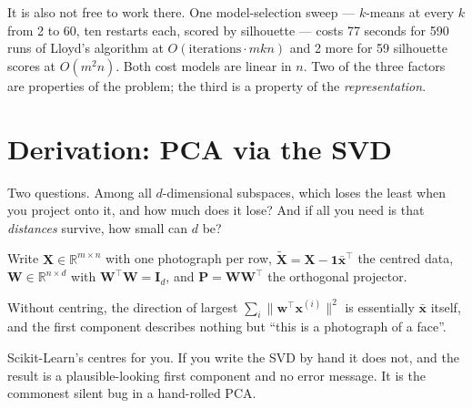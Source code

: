 \documentclass[11pt,a4paper]{article}
\begin{document}
It is also not free to work there. One model-selection sweep --- $k$-means at
every $k$ from 2 to 60, ten restarts each, scored by silhouette --- costs 77
seconds for 590 runs of Lloyd's algorithm at $O(\text{iterations}\cdot mkn)$
and 2 more for 59 silhouette scores at $O(m^2 n)$. Both cost models are linear
in $n$. Two of the three factors are properties of the problem; the third is a
property of the \emph{representation}.

\section{Derivation: PCA via the SVD}

Two questions. Among all $d$-dimensional subspaces, which loses the least when
you project onto it, and how much does it lose? And if all you need is that
\emph{distances} survive, how small can $d$ be?

Write $\mathbf{X} \in \mathbb{R}^{m\times n}$ with one photograph per row,
$\tilde{\mathbf{X}} = \mathbf{X} - \mathbf{1}\bar{\mathbf{x}}^{\intercal}$ the
centred data, $\mathbf{W} \in \mathbb{R}^{n\times d}$ with
$\mathbf{W}^{\intercal}\mathbf{W} = \mathbf{I}_d$, and
$\mathbf{P} = \mathbf{W}\mathbf{W}^{\intercal}$ the orthogonal projector.

\begin{failbox}[title={Failure condition --- an SVD taken without centring}]
Without centring, the direction of largest $\sum_i\lVert\mathbf{w}^{\intercal}
\mathbf{x}^{(i)}\rVert^2$ is essentially $\bar{\mathbf{x}}$ itself, and the
first component describes nothing but ``this is a photograph of a face''.

Scikit-Learn's  centres for you. If you write the SVD by hand it does
not, and the result is a plausible-looking first component and no error
message. It is the commonest silent bug in a hand-rolled PCA.
\end{failbox}
\end{document}
